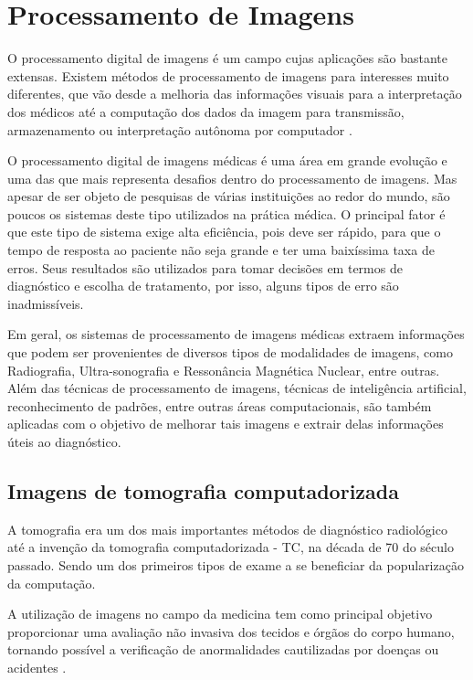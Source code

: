 \chapter{Processamento de Imagens}

O processamento digital de imagens é um campo cujas aplicações são bastante extensas. Existem métodos de processamento de imagens para interesses muito diferentes, que vão desde a melhoria das informações visuais para a interpretação dos médicos até a computação dos dados da imagem para transmissão, armazenamento ou interpretação autônoma por computador \cite{gonzalez}.

O processamento digital de imagens médicas é uma área em grande evolução e uma das que mais representa desafios dentro do processamento de imagens. Mas apesar de ser objeto de pesquisas de várias instituições ao redor do mundo, são poucos os sistemas deste tipo utilizados na prática médica. O principal fator é que este tipo de sistema exige alta eficiência, pois deve ser rápido, para que o tempo de resposta ao paciente não seja grande e ter uma baixíssima taxa de erros. Seus resultados são utilizados para tomar decisões em termos de diagnóstico e escolha de tratamento, por isso, alguns tipos de erro são inadmissíveis.

Em geral, os sistemas de processamento de imagens médicas extraem informações que podem ser provenientes de diversos tipos de modalidades de imagens, como Radiografia, Ultra-sonografia e Ressonância Magnética Nuclear, entre outras. Além das técnicas de processamento de imagens, técnicas de inteligência artificial, reconhecimento de padrões, entre outras áreas computacionais, são também aplicadas com o objetivo de melhorar tais imagens e extrair delas informações úteis ao diagnóstico.

\section{Imagens de tomografia computadorizada}

A tomografia era um dos mais importantes métodos de diagnóstico radiológico até a invenção da tomografia computadorizada - TC, na década de 70 do século passado. Sendo um dos primeiros tipos de exame a se beneficiar da popularização da computação.

A utilização de imagens no campo da medicina tem como principal objetivo proporcionar uma avaliação não invasiva dos tecidos e órgãos do corpo humano, tornando possível a verificação de anormalidades cautilizadas por doenças ou acidentes \cite{oliveira}.

